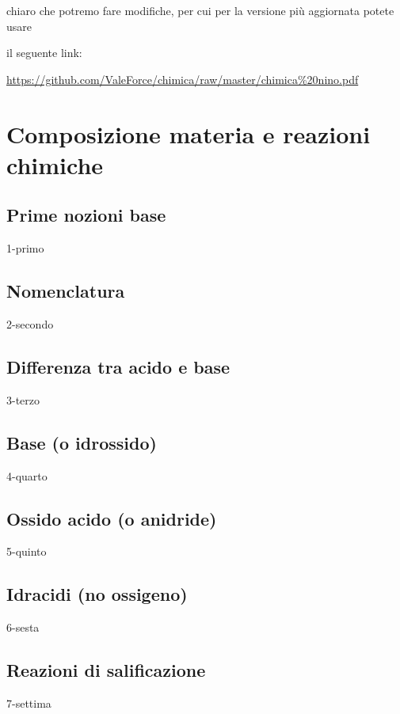 \documentclass[12pt]{book}%
\newcommand\blankpage{%
    \null
    \thispagestyle{empty}%
    \newpage}
\begin{document}
chiaro che potremo fare modifiche, per cui per la versione più aggiornata potete usare

il seguente link:

\begin{center}
\url{https://github.com/ValeForce/chimica/raw/master/chimica%20nino.pdf}
\end{center}

\afterpage{\blankpage}
\newpage

\chapter{Composizione materia e reazioni chimiche}

  \section{Prime nozioni base}
    {1-primo}

    \newpage

  \section{Nomenclatura}
    {2-secondo}

  \section{Differenza tra acido e base}
    {3-terzo}

  \section{Base (o idrossido)}
    {4-quarto}

  \section{Ossido acido (o anidride)}
    {5-quinto}

  \section{Idracidi (no ossigeno)}
    {6-sesta}

  \section{Reazioni di salificazione}
    {7-settima}
\end{document}
